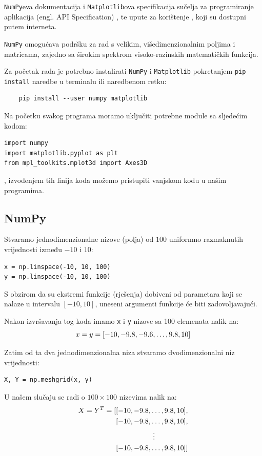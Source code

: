 \verb|NumPy|eva dokumentacija\cite{numpy_doc} i \verb|Matplotlib|ova specifikacija sučelja za programiranje aplikacija (engl. API Specification) \cite{mpl_api}, te upute za korištenje \cite{mpl_ug}, koji su dostupni putem interneta.

\verb|NumPy| omogućava podršku za rad s velikim, višedimenzionalnim poljima i matricama, zajedno sa širokim spektrom visoko-razinskih matematičkih funkcija.\par

Za početak rada je potrebno instalirati \verb|NumPy| i \verb|Matplotlib| pokretanjem \verb|pip install| naredbe u terminalu ili naredbenom retku:
\begin{verbatim}
    pip install --user numpy matplotlib
\end{verbatim}

Na početku svakog programa moramo uključiti potrebne module sa sljedećim kodom\cite[][naslov 5.4.2. Submodules]{py_lang_ref}:
\begin{verbatim}
import numpy
import matplotlib.pyplot as plt
from mpl_toolkits.mplot3d import Axes3D
\end{verbatim}
, izvođenjem tih linija koda možemo pristupiti vanjskom kodu u našim programima.

\subsection{NumPy}

Stvaramo jednodimenzionalne nizove (polja) od $100$ uniformno razmaknutih vrijednosti između $-10$ i $10$:
\begin{verbatim}
x = np.linspace(-10, 10, 100)
y = np.linspace(-10, 10, 100)
\end{verbatim}
S obzirom da su ekstremi funkcije (rješenja) dobiveni od parametara koji se nalaze u intervalu $[-10, 10]$, uneseni argumenti funkcije će biti zadovoljavajući.\par
Nakon izvršavanja tog koda imamo \verb|x| i \verb|y| nizove sa 100 elemenata nalik na:
$$
    x = y = [-10,\space-9.8,\space-9.6,\dots,\space9.8,\space10]
$$

Zatim od ta dva jednodimenzionalna niza stvaramo dvodimenzionalni niz vrijednosti:
\begin{verbatim}
X, Y = np.meshgrid(x, y)
\end{verbatim}
U našem slučaju se radi o $100\times100$ nizevima nalik na:
\begin{align*}
    X = Y^T = [&[-10,\space-9.8,\dots,\space9.8,\space10],\\
    &[-10,\space-9.8,\dots,\space9.8,\space10],\\
    &\hspace*{0.15\linewidth}\vdots\\
    &[-10,\space-9.8,\dots,\space9.8,\space10]]
\end{align*}

